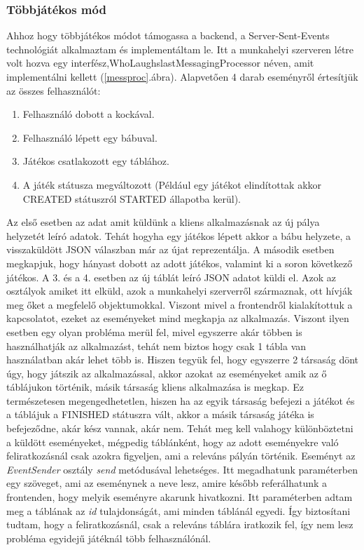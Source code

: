 \documentclass[a4paper,twoside]{article}
\begin{document}
\subsubsection{Többjátékos mód}
Ahhoz hogy többjátékos módot támogassa a backend, a Server-Sent-Events technológiát alkalmaztam és implementáltam le. Itt a munkahelyi szerveren létre volt hozva egy interfész,WhoLaughslastMessagingProcessor néven, amit implementálni kellett (\ref{messproc}.ábra). Alapvetően 4 darab eseményről értesítjük az összes felhasználót: \begin{enumerate}
	\item Felhasználó dobott a kockával.
	\item Felhasználó lépett egy bábuval.
	\item Játékos csatlakozott egy táblához.
	\item A játék státusza megváltozott (Például egy játékot elindítottak akkor CREATED státuszról STARTED állapotba kerül).
\end{enumerate}
Az első esetben az adat amit küldünk a kliens alkalmazásnak az új pálya helyzetét leíró adatok. Tehát hogyha egy játékos lépett akkor a bábu helyzete, a visszaküldött JSON válaszban már az újat reprezentálja. A második esetben megkapjuk, hogy hányast dobott az adott játékos, valamint ki a soron következő játékos. A 3. és a 4. esetben az új táblát leíró JSON adatot küldi el. Azok az osztályok amiket itt elküld, azok a munkahelyi szerverről származnak, ott hívják meg őket a megfelelő objektumokkal. Viszont mivel a frontendről kialakítottuk a kapcsolatot, ezeket az eseményeket mind megkapja az alkalmazás. Viszont ilyen esetben egy olyan probléma merül fel, mivel egyszerre akár többen is használhatják az alkalmazást, tehát nem biztos hogy csak 1 tábla van használatban akár lehet több is. Hiszen tegyük fel, hogy egyszerre 2 társaság dönt úgy, hogy játszik az alkalmazással, akkor azokat az eseményeket amik az ő táblájukon történik, másik társaság kliens alkalmazása is megkap. Ez természetesen megengedhetetlen, hiszen ha az egyik társaság befejezi a játékot és a táblájuk a FINISHED státuszra vált, akkor a másik társaság játéka is befejeződne, akár kész vannak, akár nem. Tehát meg kell valahogy különböztetni a küldött eseményeket, mégpedig táblánként, hogy az adott eseményekre való feliratkozásnál csak azokra figyeljen, ami a releváns pályán történik. Eseményt az \textit{EventSender} osztály \textit{send} metódusával lehetséges. Itt megadhatunk paraméterben egy szöveget, ami az eseménynek a neve lesz, amire később referálhatunk a frontenden, hogy melyik eseményre akarunk hivatkozni. Itt paraméterben adtam meg a táblának az \textit{id} tulajdonságát, ami minden táblánál egyedi. Így biztosítani tudtam, hogy a feliratkozásnál, csak a releváns táblára iratkozik fel, így nem lesz probléma egyidejű játéknál több felhasználónál. 
\end{document}
